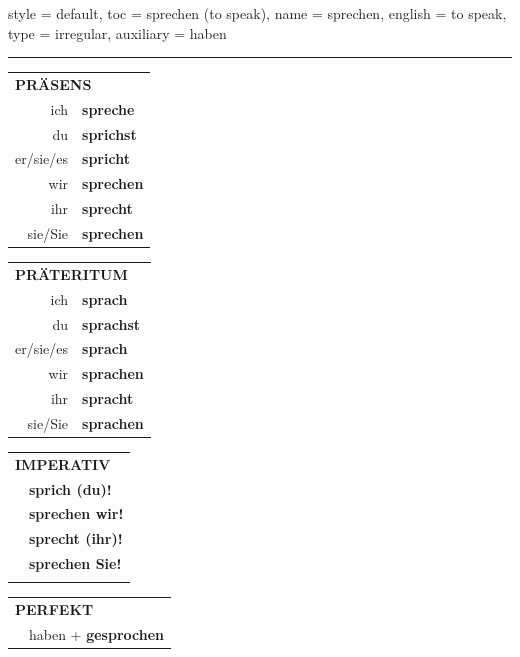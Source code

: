 \begin{verbentry}{
  style = {default},
  toc = {sprechen (to speak)},
  name = {sprechen},
  english = {to speak},
  type = {irregular},
  auxiliary = {haben}
}
 
    
     \vspace{5pt}

    \hrule
    
    \vspace{5pt}

  \begin{tabular}{rl}
     \multicolumn{2}{l}{\textbf{PRÄSENS} }\\
    ich & \textbf{spreche}\\
    du & \textbf{sprichst}\\
    er/sie/es & \textbf{spricht}\\
    wir & \textbf{sprechen}\\
    ihr & \textbf{sprecht}\\
    sie/Sie & \textbf{sprechen}\\
  \end{tabular}
  \hfill
     \begin{tabular}{rl}
    \multicolumn{2}{l}{\textbf{PRÄTERITUM} }\\
    ich & \textbf{sprach}\\
    du & \textbf{sprachst}\\
    er/sie/es & \textbf{sprach}\\
    wir & \textbf{sprachen}\\
    ihr & \textbf{spracht}\\
    sie/Sie & \textbf{sprachen}\\
  \end{tabular}
  \hfill
  \begin{tabular}{rl}
     \multicolumn{2}{l}{\textbf{IMPERATIV} }\\
   & \textbf{sprich (du)!}\\
   & \textbf{sprechen wir!}\\
   & \textbf{sprecht (ihr)!}\\
   & \textbf{sprechen Sie!}\\
   & \vspace{10pt}
  \end{tabular}

    \vspace{10pt}

 \begin{tabular}{rl}
     \multicolumn{2}{l}{\textbf{PERFEKT}}\\
  &  haben + \textbf{gesprochen}\\
  \end{tabular}
\hfill
   \begin{tabular}{rl}
   

\end{tabular}
\end{verbentry}
